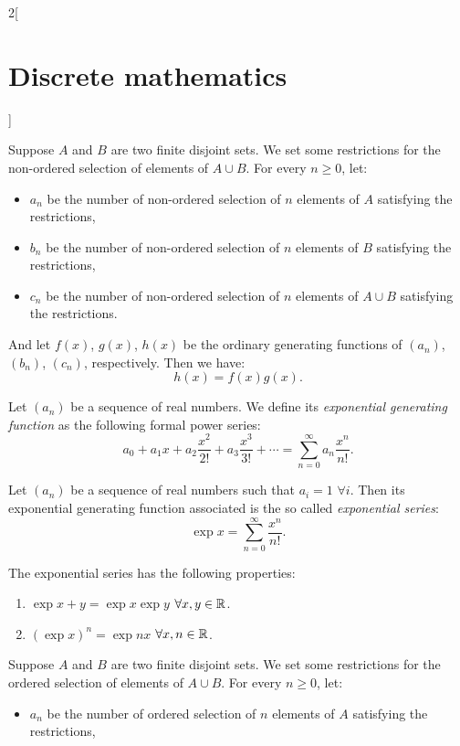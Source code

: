 \documentclass[../../../main.tex]{subfiles}
\begin{document}
\begin{multicols}{2}[\section{Discrete mathematics}]
\begin{prop}
    \end{prop}
    \begin{prop}
        Suppose $A$ and $B$ are two finite disjoint sets. We set some restrictions for the non-ordered selection of elements of $A\cup B$. For every $n\geq 0$, let:
        \begin{itemize}
            \item $a_n$ be the number of non-ordered selection of $n$ elements of $A$ satisfying the restrictions,
            \item $b_n$ be the number of non-ordered selection of $n$ elements of $B$ satisfying the restrictions,
            \item $c_n$ be the number of non-ordered selection of $n$ elements of $A\cup B$ satisfying the restrictions.
        \end{itemize}
        And let $f(x)$, $g(x)$, $h(x)$ be the ordinary generating functions of $(a_n)$, $(b_n)$, $(c_n)$, respectively. Then we have: $$h(x)=f(x)g(x).$$
    \end{prop}
    \begin{definition}
        Let $(a_n)$ be a sequence of real numbers. We define its \textit{exponential generating function} as the following formal power series: $$a_0+a_1x+a_2\frac{x^2}{2!}+a_3\frac{x^3}{3!}+\cdots=\sum_{n=0}^\infty a_n\frac{x^n}{n!}.$$
    \end{definition}
    \begin{definition}
        Let $(a_n)$ be a sequence of real numbers such that $a_i=1$ $\forall i$. Then its exponential generating function associated is the so called \textit{exponential series}: $$\exp{x}=\sum_{n=0}^\infty \frac{x^n}{n!}.$$
    \end{definition}
    \begin{prop}
        The exponential series has the following properties:
        \begin{enumerate}
            \item $\exp{x+y}=\exp{x}\exp{y}$ $\forall x,y\in\mathbb{R} $.
            \item $(\exp{x})^n=\exp{nx}$ $\forall x,n\in\mathbb{R} $.
        \end{enumerate}
    \end{prop}
    \begin{prop}
        Suppose $A$ and $B$ are two finite disjoint sets. We set some restrictions for the ordered selection of elements of $A\cup B$. For every $n\geq 0$, let:
        \begin{itemize}
            \item $a_n$ be the number of ordered selection of $n$ elements of $A$ satisfying the restrictions,

\end{itemize}
\end{prop}
\end{multicols}
\end{document}
